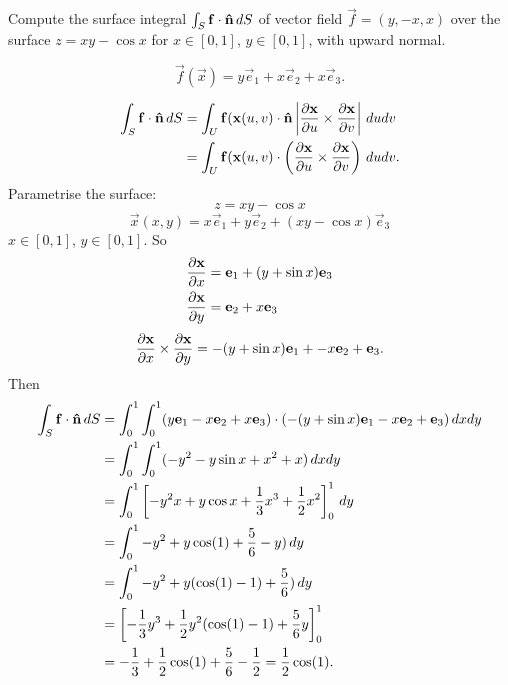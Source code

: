 \documentclass[10pt, a4paper]{article}
\begin{document}
\begin{problem}[$2013$ question $5$]
    Compute the surface integral $\int_{S}\vec{f}\cdot\hvec{n}\,dS$ of vector field $\vec{f} = (y, -x, x)$ over the surface $z = xy - \cos{x}$ for $x \in [0, 1]$,
    $y \in [0, 1]$,
    with upward normal.

    \begin{solution}
        \[
        \vec{f}(\vec{x}) = y\vec{e}_1 + x\vec{e}_2 + x\vec{e}_3.
        \]

        \begin{align*}
            \int_{S}\vec{f}\cdot\hvec{n}\,dS &= \int_{U}\vec{f}(\vec{x}(u, v)\cdot\hvec{n}\left|\pd[\vec{x}]{u}\times \pd[\vec{x}]{v}\right|\,dudv \\
            &= \int_{U}\vec{f}(\vec{x}(u, v)\cdot\left(\pd[\vec{x}]{u}\times \pd[\vec{x}]{v}\right)\,dudv.
        \end{align*}
        Parametrise the surface:
        \[
        z = xy - \cos{x}
        \]
        \[
        \vec{x}(x, y) = x\vec{e}_1 + y\vec{e}_2 + (xy - \cos{x})\vec{e}_3
        \]
        $x \in [0, 1]$,
        $y \in [0, 1]$.
        So
        \begin{align*}
            \pd[\vec{x}]{x} &= \vec{e}_1 + (y + \sin{x})\vec{e}_3 \\
            \pd[\vec{x}]{y} &= \vec{e}_2 + x\vec{e}_3
        \end{align*}
        \[
        \pd[\vec{x}]{x} \times \pd[\vec{x}]{y} = -(y + \sin{x})\vec{e}_1 + -x\vec{e}_2 + \vec{e}_3.
        \]
        Then
        \begin{align*}
            \int_{S}\vec{f}\cdot\hvec{n}\,dS &= \int_{0}^{1}\int_{0}^{1}(y\vec{e}_1 - x\vec{e}_2 + x\vec{e}_3)\cdot(-(y + \sin{x})\vec{e}_1 - x\vec{e}_2 + \vec{e}_3)\,dxdy \\
            &= \int_{0}^{1}\int_{0}^{1}(-y ^ 2 -y\sin{x} + x ^ 2 + x)\,dxdy \\
            &= \int_{0}^{1}\left[-y ^ 2x + y\cos{x} + \frac{1}{3}x ^ 3 + \frac{1}{2}x ^ 2\right]_{0}^{1}\,dy \\
            &= \int_{0}^{1}-y ^ 2 + y\cos(1) + \frac{5}{6} - y)\,dy \\
            &= \int_{0}^{1}-y ^ 2 + y(\cos(1) - 1) + \frac{5}{6})\,dy \\
            &= \left[-\frac{1}{3}y ^ 3 + \frac{1}{2}y ^ 2(\cos(1) - 1) + \frac{5}{6}y\right]_{0}^{1} \\
            &= -\frac{1}{3} + \frac{1}{2}\cos(1) + \frac{5}{6} - \frac{1}{2} = \frac{1}{2}\cos(1).
        \end{align*}
    \end{solution}
\end{problem}
\end{document}
